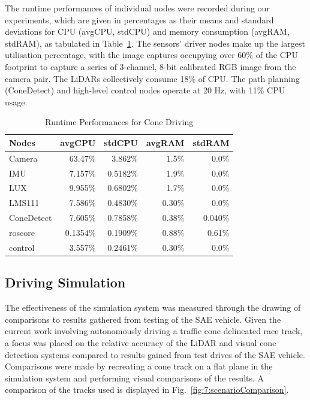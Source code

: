The runtime performances of individual nodes were recorded during our experiments, which are given in percentages as their means and standard deviations for CPU (avgCPU, stdCPU) and memory consumption (avgRAM, stdRAM), as tabulated in Table~\ref{tbl:7:runtime}. The sensors’ driver nodes make up the largest utilisation percentage, with the image captures occupying over 60\% of the CPU footprint to capture a series of 3-channel, 8-bit calibrated RGB image from the camera pair. The LiDARs collectively consume 18\% of CPU. The path planning (ConeDetect) and high-level control nodes operate at 20 Hz, with 11\% CPU usage.


\begin{table}[H]
	\caption{Runtime Performances for Cone Driving}
	\label{tbl:7:runtime}
	\centering
	\begin{tabular}{lrrrr}
		\toprule
		Nodes      &  avgCPU  &  stdCPU  & avgRAM & stdRAM  \\ \midrule
		Camera     & 63.47\%  & 3.862\%  & 1.5\%  &  0.0\%  \\
		IMU        & 7.157\%  & 0.5182\% & 1.9\%  &  0.0\%  \\
		LUX        & 9.955\%  & 0.6802\% & 1.7\%  &  0.0\%  \\
		LMS111     & 7.586\%  & 0.4830\% & 0.30\% &  0.0\%  \\
		ConeDetect & 7.605\%  & 0.7858\% & 0.38\% & 0.040\% \\
		roscore    & 0.1354\% & 0.1909\% & 0.88\% & 0.61\%  \\
		control    & 3.557\%  & 0.2461\% & 0.30\% &  0.0\%  \\ \bottomrule
	\end{tabular}
\end{table}

\subsection{Driving Simulation}\label{sec:7:benchdrive}
The effectiveness of the simulation system was measured through the drawing of comparisons to results gathered from testing of the SAE vehicle. Given the current work involving autonomously driving a traffic cone delineated race track, a focus was placed on the relative accuracy of the LiDAR and visual cone detection systems compared to results gained from test drives of the SAE vehicle. Comparisons were made by recreating a cone track on a flat plane in the simulation system and performing visual comparisons of the results. A comparison of the tracks used is displayed in Fig.~\ref{fig:7:scenarioComparison}.

